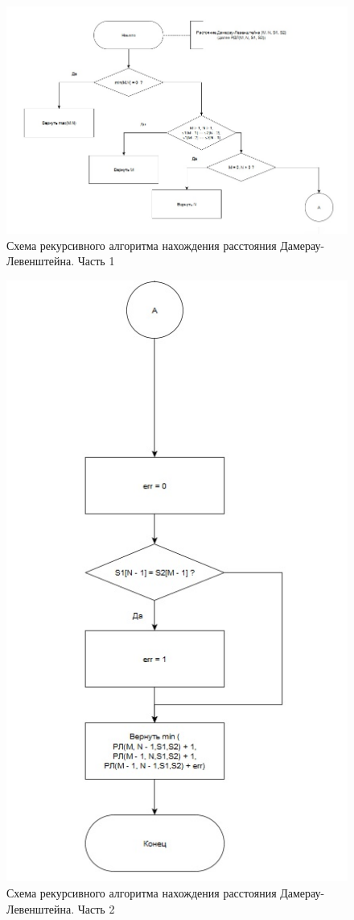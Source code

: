 \documentclass[14pt,russian]{scrartcl}
\begin{document}
\begin{figure}[h]
	\centering
	\includegraphics[scale=0.85]{damer-lev_rec1.jpg}
	\caption{Схема рекурсивного алгоритма нахождения расстояния Дамерау-Левенштейна. Часть 1}
	\label{fig:rec_dam_lev1}
\end{figure}

\begin{figure}[h]
	\centering
	\includegraphics[scale=0.85]{damer-lev_rec2.jpg}
	\caption{Схема рекурсивного алгоритма нахождения расстояния Дамерау-Левенштейна. Часть 2}
	\label{fig:rec_dam_lev2}
\end{figure}
\end{document}
